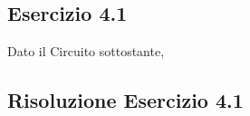 \documentclass[\main/main.tex]{subfiles}
\begin{document}
\subsection{Esercizio 4.1}
Dato il Circuito sottostante,

\clearpage
\subsection{Risoluzione Esercizio 4.1}
\end{document}
